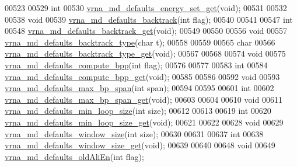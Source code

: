\begin{DoxyCode}
00523 
00529 \textcolor{keywordtype}{int}
00530 \hyperlink{group__model__details_ga017ed6afb1cba2b7f242412cab618b53}{vrna\_md\_defaults\_energy\_set\_get}(\textcolor{keywordtype}{void});
00531 
00532 
00538 \textcolor{keywordtype}{void}
00539 \hyperlink{group__model__details_ga978c468b2fe96a70d5191e3dd17d5599}{vrna\_md\_defaults\_backtrack}(\textcolor{keywordtype}{int} flag);
00540 
00541 
00547 \textcolor{keywordtype}{int}
00548 \hyperlink{group__model__details_ga90da1156e6883ddd68527c2830706648}{vrna\_md\_defaults\_backtrack\_get}(\textcolor{keywordtype}{void});
00549 
00550 
00556 \textcolor{keywordtype}{void}
00557 \hyperlink{group__model__details_ga68305274de96b56b7799575e222560d8}{vrna\_md\_defaults\_backtrack\_type}(\textcolor{keywordtype}{char} t);
00558 
00559 
00565 \textcolor{keywordtype}{char}
00566 \hyperlink{group__model__details_ga1425b4ebd0e034dead66d79becd64143}{vrna\_md\_defaults\_backtrack\_type\_get}(\textcolor{keywordtype}{void});
00567 
00568 
00574 \textcolor{keywordtype}{void}
00575 \hyperlink{group__model__details_gaf1b5db10f1f476767f9a95f8a78e3132}{vrna\_md\_defaults\_compute\_bpp}(\textcolor{keywordtype}{int} flag);
00576 
00577 
00583 \textcolor{keywordtype}{int}
00584 \hyperlink{group__model__details_gaa3a537e61fbe0518673bf9f73fd820f3}{vrna\_md\_defaults\_compute\_bpp\_get}(\textcolor{keywordtype}{void});
00585 
00586 
00592 \textcolor{keywordtype}{void}
00593 \hyperlink{group__model__details_ga4c4bc962f09b4480cb8499f1cf8ae4ec}{vrna\_md\_defaults\_max\_bp\_span}(\textcolor{keywordtype}{int} span);
00594 
00595 
00601 \textcolor{keywordtype}{int}
00602 \hyperlink{group__model__details_gaa60f989e062fecd4d4bac89c1883da85}{vrna\_md\_defaults\_max\_bp\_span\_get}(\textcolor{keywordtype}{void});
00603 
00604 
00610 \textcolor{keywordtype}{void}
00611 \hyperlink{group__model__details_gac152f1e78c1058a10261022c8dfda0f7}{vrna\_md\_defaults\_min\_loop\_size}(\textcolor{keywordtype}{int} size);
00612 
00613 
00619 \textcolor{keywordtype}{int}
00620 \hyperlink{group__model__details_ga5cc691174a75c652807dc361b617632a}{vrna\_md\_defaults\_min\_loop\_size\_get}(\textcolor{keywordtype}{void});
00621 
00622 
00628 \textcolor{keywordtype}{void}
00629 \hyperlink{group__model__details_ga7b802ce0e8c3181bf5cb580de6d5b26a}{vrna\_md\_defaults\_window\_size}(\textcolor{keywordtype}{int} size);
00630 
00631 
00637 \textcolor{keywordtype}{int}
00638 \hyperlink{group__model__details_ga670146a9aa3ba77f4d422d60b7c30ac9}{vrna\_md\_defaults\_window\_size\_get}(\textcolor{keywordtype}{void});
00639 
00640 
00648 \textcolor{keywordtype}{void}
00649 \hyperlink{group__model__details_ga41521d5b9fb7e0f31e7ea73f5792afab}{vrna\_md\_defaults\_oldAliEn}(\textcolor{keywordtype}{int} flag);

\end{DoxyCode}
